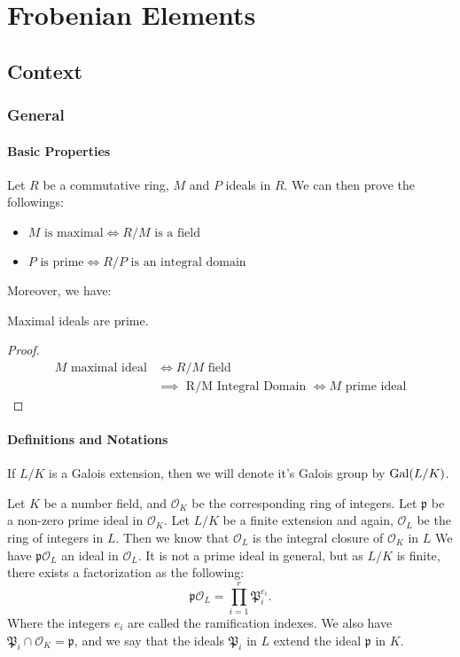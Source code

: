 \section{Frobenian Elements}
\subsection{Context}
\subsubsection{General}
\paragraph{Basic Properties}
Let $R$ be a commutative ring, $M$ and $P$ ideals in $R$.
We can then prove the followings:
\begin{itemize}
    \item $M \text{ is maximal} \iff R/M \text{ is a field}$
    \item $P \text{ is prime} \iff R/P \text{ is an integral domain}$
\end{itemize}

Moreover, we have:
\begin{property}
    Maximal ideals are prime. 
\end{property}
\begin{proof}
    \begin{align*}
        M \text{ maximal ideal} &\iff R/M \text{ field}\\
                                &\implies \text{ R/M Integral Domain } \iff M \text{ prime ideal}
    \end{align*}
\end{proof}

\paragraph{Definitions and Notations}
If $L/K$ is a Galois extension, then we will denote it's Galois group by $\text{Gal}(L/K)$.

Let $K$ be a number field, and $\mathcal{O}_K$ be the corresponding ring of integers.
Let $\mathfrak{p}$ be a non-zero prime ideal in $\mathcal{O}_K$.
Let $L/K$ be a finite extension and again, $\mathcal{O}_L$ be the ring of integers in $L$.
Then we know that $\mathcal{O}_L$ is the integral closure of $\mathcal{O}_K$ in $L$
We have $\mathfrak{p}\mathcal{O}_L$ an ideal in $\mathcal{O}_L$.
It is not a prime ideal in general, but as $L/K$ is finite, there exists a factorization as the following:
$$
\mathfrak{p}\mathcal{O}_L = \prod_{i=1}^r \mathfrak{P}_i^{e_i}.
$$
Where the integers $e_i$ are called the ramification indexes.
We also have $\mathfrak{P}_i \cap \mathcal{O}_K = \mathfrak{p}$, and we say that the ideals $\mathfrak{P}_i$ in $L$ extend the ideal $\mathfrak{p}$ in $K$.

